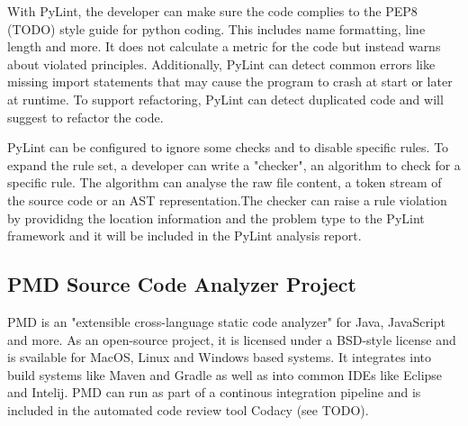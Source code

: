 With PyLint, the developer can make sure the code complies to the PEP8 (TODO) style guide for python coding. This includes name formatting, line length and more. It does not calculate a metric for the code but instead warns about violated principles. Additionally, PyLint can detect common errors like missing import statements that may cause the program to crash at start or later at runtime. To support refactoring, PyLint can detect duplicated code and will suggest to refactor the code.

PyLint can be configured to ignore some checks and to disable specific rules. To expand the rule set, a developer can write a "checker", an algorithm to check for a specific rule. The algorithm can analyse the raw file content, a token stream of the source code or an AST representation.The checker can raise a rule violation by provididng the location information and the problem type to the PyLint framework and it will be included in the PyLint analysis report.

\subsection{PMD Source Code Analyzer Project}
PMD is an "extensible cross-language static code analyzer" for Java, JavaScript and more. As an open-source project, it is licensed under a BSD-style license and is svailable for MacOS, Linux and Windows based systems. It integrates into build systems like Maven and Gradle as well as into common IDEs like Eclipse and Intelij. PMD can run as part of a continous integration pipeline and is included in the automated code review tool Codacy (see TODO).


